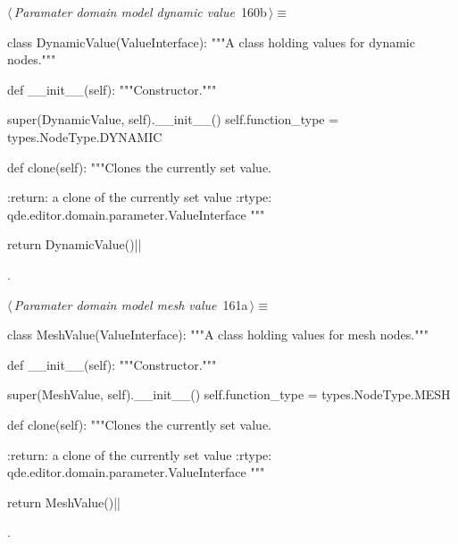 \documentclass[%
    a4paper,    %
    justified,  %
    nobib,      %
    openany     %
]{tufte-book}
\begin{document}
\begin{flushleft} \small
\begin{minipage}{\linewidth}\label{scrap184}\raggedright\small
{} $\langle\,${\itshape Paramater domain model dynamic value}\nobreak\ {\footnotesize {160b}}$\,\rangle\equiv$
\vspace{-1ex}
\begin{pythoncode}
class DynamicValue(ValueInterface):
    """A class holding values for dynamic nodes."""

    def __init__(self):
        """Constructor."""

        super(DynamicValue, self).__init__()
        self.function_type = types.NodeType.DYNAMIC

    def clone(self):
        """Clones the currently set value.

        :return: a clone of the currently set value
        :rtype:  qde.editor.domain.parameter.ValueInterface
        """

        return DynamicValue()|\NWsep|
\end{pythoncode}
\vspace{1.5ex}
\footnotesize
\begin{list}{}{\setlength{\itemsep}{-\parsep}\setlength{\itemindent}{-\leftmargin}}
\item {\NWtxtMacroNoRef}.

\item{}
\end{list}
\end{minipage}\vspace{4ex}
\end{flushleft}
\begin{flushleft} \small
\begin{minipage}{\linewidth}\label{scrap185}\raggedright\small
{} $\langle\,${\itshape Paramater domain model mesh value}\nobreak\ {\footnotesize {161a}}$\,\rangle\equiv$
\vspace{-1ex}
\begin{pythoncode}
class MeshValue(ValueInterface):
    """A class holding values for mesh nodes."""

    def __init__(self):
        """Constructor."""

        super(MeshValue, self).__init__()
        self.function_type = types.NodeType.MESH

    def clone(self):
        """Clones the currently set value.

        :return: a clone of the currently set value
        :rtype:  qde.editor.domain.parameter.ValueInterface
        """

        return MeshValue()|\NWsep|
\end{pythoncode}
\vspace{1.5ex}
\footnotesize
\begin{list}{}{\setlength{\itemsep}{-\parsep}\setlength{\itemindent}{-\leftmargin}}
\item {\NWtxtMacroNoRef}.

\item{}
\end{list}
\end{minipage}\vspace{4ex}
\end{flushleft}
\end{document}
